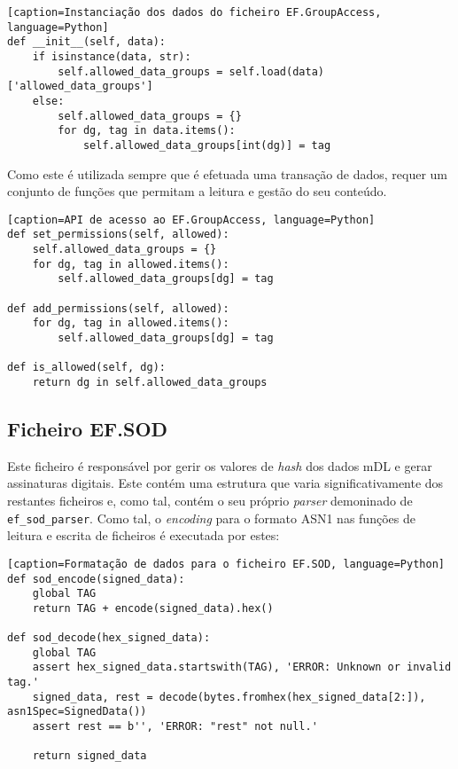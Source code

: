 \begin{verbatim}[caption=Instanciação dos dados do ficheiro EF.GroupAccess, language=Python]
def __init__(self, data):
    if isinstance(data, str):
        self.allowed_data_groups = self.load(data)['allowed_data_groups']
    else:
        self.allowed_data_groups = {}
        for dg, tag in data.items():
            self.allowed_data_groups[int(dg)] = tag
\end{verbatim}

Como este é utilizada sempre que é efetuada uma transação de dados, requer um conjunto de funções que permitam a leitura e gestão do seu conteúdo.

\begin{verbatim}[caption=API de acesso ao EF.GroupAccess, language=Python]
def set_permissions(self, allowed):
    self.allowed_data_groups = {}
    for dg, tag in allowed.items():
        self.allowed_data_groups[dg] = tag

def add_permissions(self, allowed):
    for dg, tag in allowed.items():
        self.allowed_data_groups[dg] = tag

def is_allowed(self, dg):
    return dg in self.allowed_data_groups
\end{verbatim}


\subsection{Ficheiro EF.SOD}

Este ficheiro é responsável por gerir os valores de \textit{hash} dos dados mDL e gerar assinaturas digitais. Este contém uma estrutura que varia significativamente dos restantes ficheiros e, como tal, contém o seu próprio \textit{parser} demoninado de \texttt{ef_sod_parser}. Como tal, o \textit{encoding} para o formato ASN1 nas funções de leitura e escrita de ficheiros é executada por estes:

\begin{verbatim}[caption=Formatação de dados para o ficheiro EF.SOD, language=Python]
def sod_encode(signed_data):
    global TAG
    return TAG + encode(signed_data).hex()

def sod_decode(hex_signed_data):
    global TAG
    assert hex_signed_data.startswith(TAG), 'ERROR: Unknown or invalid tag.'
    signed_data, rest = decode(bytes.fromhex(hex_signed_data[2:]), asn1Spec=SignedData())
    assert rest == b'', 'ERROR: "rest" not null.'

    return signed_data
\end{verbatim}

